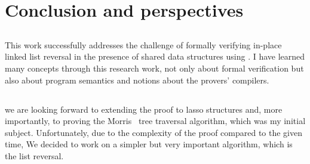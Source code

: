 \documentclass[11pt,a4paper]{article}
\begin{document}
\section{Conclusion and perspectives}
\subsection{}
This work successfully addresses the challenge of formally verifying in-place linked list reversal in the presence of shared data structures using \creusot{}. I have learned many concepts through this research work, not only about formal verification but also about program semantics and notions about the provers' compilers.

\subsection{}
we are looking forward to extending the proof to lasso structures and, more importantly, to proving the Morris~\cite{morris} tree traversal algorithm, which was my initial subject. Unfortunately, due to the complexity of the proof compared to the given time, We decided to work on a simpler but very important algorithm, which is the list reversal.
\newpage
\printbibliography

\newpage

\end{document}
